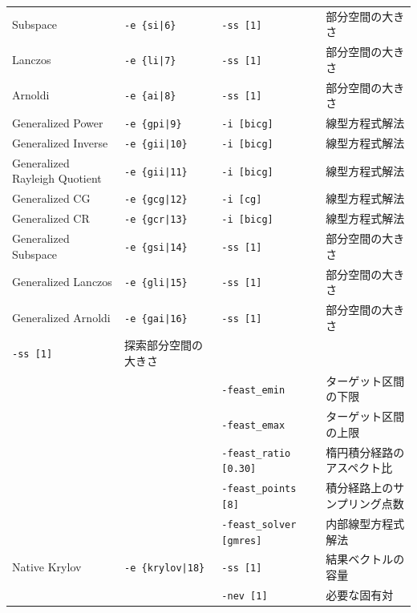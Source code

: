 \documentclass[a4paper]{jarticle}
\begin{document}
{{\begin{minipage}[t]{\textwidth}
\begin{center}
\begin{tabular}{l|lll}
 Subspace                & \verb=-e {si|6}=        &    \verb=-ss [1]= & 部分空間の大きさ \\
 Lanczos                 & \verb=-e {li|7}=        &    \verb=-ss [1]= & 部分空間の大きさ \\
 Arnoldi                 & \verb=-e {ai|8}=        &    \verb=-ss [1]= & 部分空間の大きさ \\
 Generalized Power      & \verb=-e {gpi|9}=       &    \verb=-i [bicg]= & 線型方程式解法 \\ 
 Generalized Inverse    & \verb=-e {gii|10}=       &    \verb=-i [bicg]= & 線型方程式解法 \\
 Generalized Rayleigh Quotient    & \verb=-e {gii|11}=       &    \verb=-i [bicg]= & 線型方程式解法 \\  
 Generalized CG         & \verb=-e {gcg|12}=       &    \verb=-i [cg]= & 線型方程式解法 \\
 Generalized CR         & \verb=-e {gcr|13}=       &    \verb=-i [bicg]= & 線型方程式解法 \\
 Generalized Subspace   & \verb=-e {gsi|14}=       &    \verb=-ss [1]= & 部分空間の大きさ \\
 Generalized Lanczos    & \verb=-e {gli|15}=       &    \verb=-ss [1]= & 部分空間の大きさ \\ 
 Generalized Arnoldi    & \verb=-e {gai|16}=       &    \verb=-ss [1]= & 部分空間の大きさ \\
 \verb=-ss [1]= & 探索部分空間の大きさ \\
                                   &                         &
 \verb=-feast_emin= & ターゲット区間の下限 \\
                                   &                         &
 \verb=-feast_emax= & ターゲット区間の上限 \\
                                   &                         &
 \verb=-feast_ratio [0.30]= & 楕円積分経路のアスペクト比 \\
                                   &                         &
 \verb=-feast_points [8]= & 積分経路上のサンプリング点数 \\
                                   &                         &
 \verb=-feast_solver [gmres]= & 内部線型方程式解法 \\
 Native Krylov                      & \verb=-e {krylov|18}= &
 \verb=-ss [1]= & 結果ベクトルの容量 \\
                                    &                        &
 \verb=-nev [1]= & 必要な固有対 \\

\end{tabular}
\end{center}
\end{minipage}}}
\end{document}
